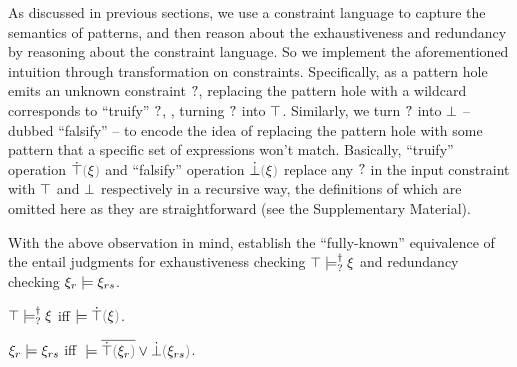 As discussed in previous sections, we use a constraint language to capture the semantics of patterns, and then reason about the exhaustiveness and redundancy by reasoning about the constraint language. So we implement the aforementioned intuition through transformation on constraints. Specifically, as a pattern hole emits an unknown constraint $\mathtt{?}$, replacing the pattern hole with a wildcard corresponds to ``truify'' $\mathtt{?}$, \ie, turning $\mathtt{?}$ into $\top$. Similarly, we turn $\mathtt{?}$ into $\bot$ -- dubbed ``falsify'' -- to encode the idea of replacing the pattern hole with some pattern that a specific set of expressions won't match. Basically, ``truify'' operation $\ctruify{\xi}$ and ``falsify'' operation $\cfalsify{\xi}$ replace any $\mathtt{?}$ in the input constraint with $\top$ and $\bot$ respectively in a recursive way, the definitions of which are omitted here as they are straightforward (see the Supplementary Material).

% 


With the above observation in mind,  establish the ``fully-known'' equivalence of the entail judgments for exhaustiveness checking $\top \models_{?}^{\dag} \xi$ and redundancy checking $\xi_r \models \xi_{rs}$.

\begin{theorem}
\label{theorem:exhaustive-truify}
  $\top \models_{?}^{\dag} \xi$ iff $\ccsatisfy{}{\ctruify{\xi}}$.
\end{theorem}

\begin{theorem}
\label{theorem:redundant-truify-falsify}
  $\xi_r \models \xi_{rs}$ iff $\ccsatisfy{\;}{\cor{\cdual{\ctruify{\xi_r}}}{\cfalsify{\xi_{rs}}}}$.
\end{theorem}




